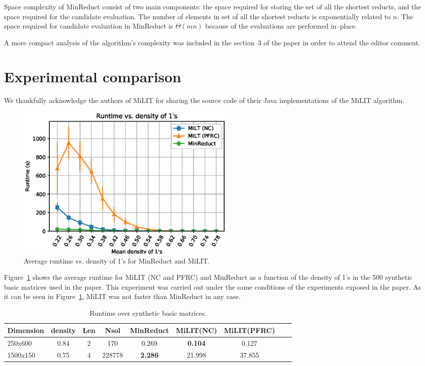 \documentclass[citenumber]{llncs}
\begin{document}
	Space complexity of MinReduct consist of two main components: the space required for storing the set of all the shortest reducts, and the space required for the candidate evaluation. The number of elements in set of all the shortest reducts is exponentially related to $n$. The space required for candidate evaluation in MinReduct is $\Theta(mn)$ because of the evaluations are performed in--place.
	
	A more compact analysis of the algorithm's complexity was included in the section~3 of the paper in order to attend the editor comment.
%
\section{Experimental comparison}\label{Comparison}
%	
	We thankfully acknowledge the authors of MiLIT for sharing the source code of their Java implementations of the MiLIT algorithm. 	
	
	\begin{figure}[hbt]
		\begin{center}
			\includegraphics[height=3in]{MinReduct_vs_milt.eps} 
		\end{center}
		\caption{Average runtime vs. density of 1’s for MinReduct and MiLIT.}\label{fig:sinthyetic}
	\end{figure}  		
	
	Figure~\ref{fig:sinthyetic} shows the average runtime for MiLIT (NC and PFRC) and MinReduct as a function of the density of 1’s in the 500 synthetic basic matrices used in the paper. This experiment was carried out under the same conditions of the experiments exposed in the paper. As it can be seen in Figure~\ref{fig:sinthyetic}, MiLIT was not faster than MinReduct in any case. 			
	
	\begin{table}[htb]
		\small
		\caption{Runtime over synthetic basic matrices.}
		\centering
		\begin{tabular}{lcccccccc}\label{tab:comparison}
			Dimension & density & Len & Nsol & MinReduct & MiLIT(NC) & MiLIT(PFRC)\\
			\hline
			250x600  & 0.84 & 2 &   170  &      0.269     & \textbf{0.104} &  0.127 \\
			1500x150 & 0.75 & 4 & 228778 & \textbf{2.286} &     21.998     & 37.855 \\
		\end{tabular}             
	\end{table}  
	
\end{document}
